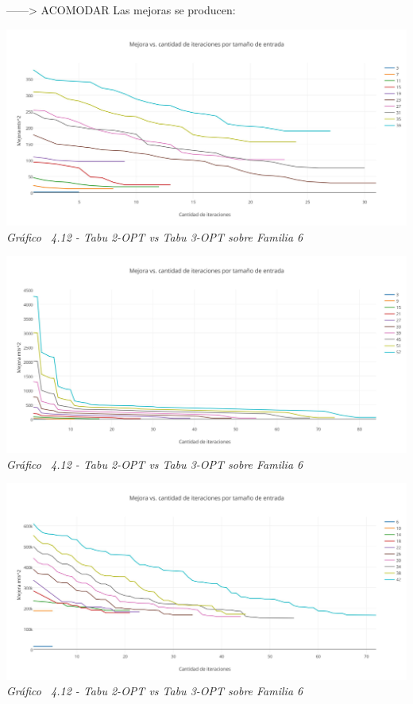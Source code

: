 ------> ACOMODAR
Las mejoras se producen:


\vspace*{0.3cm} \vspace*{0.3cm}
  \begin{center}
 \includegraphics[scale=0.5]{./EJ4/mejora.png}\\
 {            \textit{Gráfico \ 4.12 - Tabu 2-OPT vs Tabu 3-OPT sobre Familia 6}}
  \end{center}
  \vspace*{0.3cm}
  
  \vspace*{0.3cm} \vspace*{0.3cm}
  \begin{center}
 \includegraphics[scale=0.5]{./EJ4/mejora1.png}\\
 {            \textit{Gráfico \ 4.12 - Tabu 2-OPT vs Tabu 3-OPT sobre Familia 6}}
  \end{center}
  \vspace*{0.3cm}
  
  \vspace*{0.3cm} \vspace*{0.3cm}
  \begin{center}
 \includegraphics[scale=0.5]{./EJ4/mejora2.png}\\
 {            \textit{Gráfico \ 4.12 - Tabu 2-OPT vs Tabu 3-OPT sobre Familia 6}}
  \end{center}
  \vspace*{0.3cm}
  

